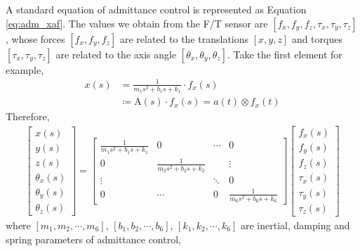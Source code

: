 \par
A standard equation of admittance control is represented as Equation \ref{eq:adm_xaf}. The values we obtain from the F/T sensor are $\left[f_x, f_y, f_z,\tau _x, \tau _y, \tau _z \right]$, whose forces $ \left[f_x, f_y, f_z\right]$ are related to the translations $ \left[x, y, z\right]$ and torques $ \left[\tau _x, \tau _y, \tau _z\right]$ are related to the axis angle $ \left[\theta _x,\theta _y,\theta _z\right]$. Take the first element for example,
\begin{equation}
\label{eq:adm_xaf}
\begin{split}
x(s)&= \frac{1}{m_1s^2+b_1s+k_1} \cdot f_x(s)	\\
  	&\coloneqq \mathrm{A}(s) \cdot f_x(s) = a(t)\otimes f_x(t)
\end{split}
\end{equation}
Therefore, 
\begin{equation}
\label{eq:adm_mbk}
\begin{split}
\begin{bmatrix}
x(s) \\
y(s) \\
z(s) \\
\theta _x(s) \\
\theta _y(s) \\
\theta _z(s) 
\end{bmatrix}
=
\begin{bmatrix}
\frac{1}{m_1s^2+b_1s+k_1}&0  &\cdots  &0 \\ 
0 & \frac{1}{m_2s^2+b_2s+k_2}  & &\vdots \\ 
\vdots& &\ddots  & 0\\ 
0   &\cdots & 0 & \frac{1}{m_6s^2+b_6s+k_6}
\end{bmatrix}
\begin{bmatrix}
f_x(s) \\
f_y(s) \\
f_z(s) \\
\tau _x(s) \\
\tau _y(s) \\
\tau _z(s) 
\end{bmatrix}
\end{split}
\end{equation}
where $[m_1,m_2,\cdots,m_6]$, $[b_1,b_2,\cdots,b_6]$, $[k_1,k_2,\cdots,k_6]$ are inertial, damping and spring parameters of admittance control, 
